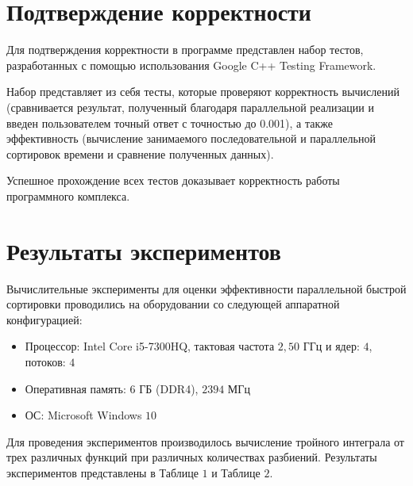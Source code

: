 \documentclass{report}
\begin{document}
\newpage

\section*{Подтверждение корректности}
Для подтверждения корректности в программе представлен набор тестов, разработанных с помощью использования Google C++ Testing Framework.
\par Набор представляет из себя тесты, которые проверяют корректность вычислений (сравнивается результат, полученный благодаря параллельной реализации и введен пользователем точный ответ с точностью до 0.001), а также эффективность (вычисление занимаемого последовательной и параллельной сортировок времени и сравнение полученных данных).
\par Успешное прохождение всех тестов доказывает корректность работы программного комплекса.

\newpage

\section*{Результаты экспериментов}
Вычислительные эксперименты для оценки эффективности параллельной быстрой сортировки проводились на оборудовании со следующей аппаратной конфигурацией:
\begin{itemize}
\item Процессор: Intel Core i5-7300HQ, тактовая частота $2,50$ ГГц и ядер: $4$, потоков: $4$
\item Оперативная память: $6$ ГБ (DDR4), $2394$ МГц
\item ОС: Microsoft Windows $10$
\end{itemize}
\par Для проведения экспериментов производилось вычисление тройного интеграла от трех различных функций при различных количествах разбиений.  Результаты экспериментов представлены в Таблице $1$ и Таблице $2$.
\end{document}
